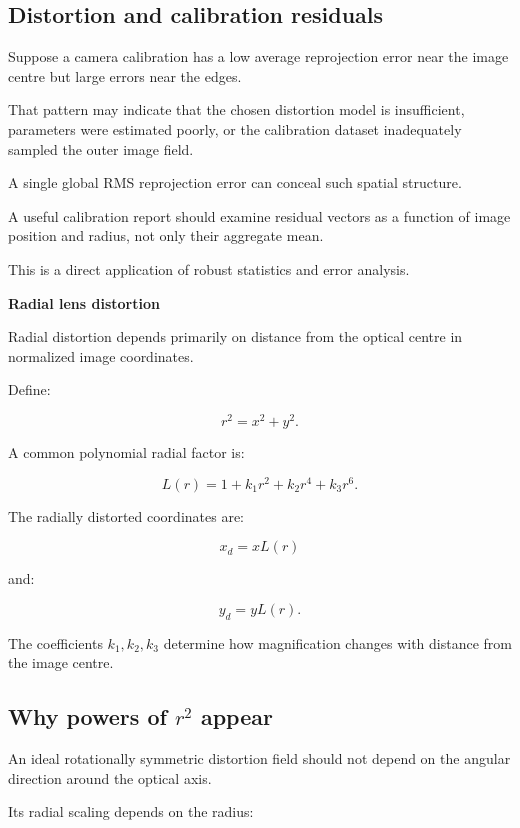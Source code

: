 \subsection{Distortion and calibration residuals}\label{02-foundations-ii-ch035-distortion-and-calibration-residuals}

Suppose a camera calibration has a low average reprojection error near the image centre but large errors near the edges.

That pattern may indicate that the chosen distortion model is insufficient, parameters were estimated poorly, or the calibration dataset inadequately sampled the outer image field.

A single global RMS reprojection error can conceal such spatial structure.

A useful calibration report should examine residual vectors as a function of image position and radius, not only their aggregate mean.

This is a direct application of robust statistics and error analysis.

\textbf{Radial lens distortion}

Radial distortion depends primarily on distance from the optical centre in normalized image coordinates.

Define:

\[
 \boxed{ r^2=x^2+y^2 }.
\]

A common polynomial radial factor is:

\[
 \boxed{ L(r)= 1+k_1r^2+k_2r^4+k_3r^6 }.
\]

The radially distorted coordinates are:

\[
 \boxed{ x_d=xL(r) }
\]

and:

\[
 \boxed{ y_d=yL(r) }.
\]

The coefficients \(k_1,k_2,k_3\) determine how magnification changes with distance from the image centre.

\subsection{\texorpdfstring{Why powers of \(r^2\) appear}{Why powers of r\^{}2 appear}}\label{02-foundations-ii-ch035-why-powers-of-r2-appear}

An ideal rotationally symmetric distortion field should not depend on the angular direction around the optical axis.

Its radial scaling depends on the radius:

